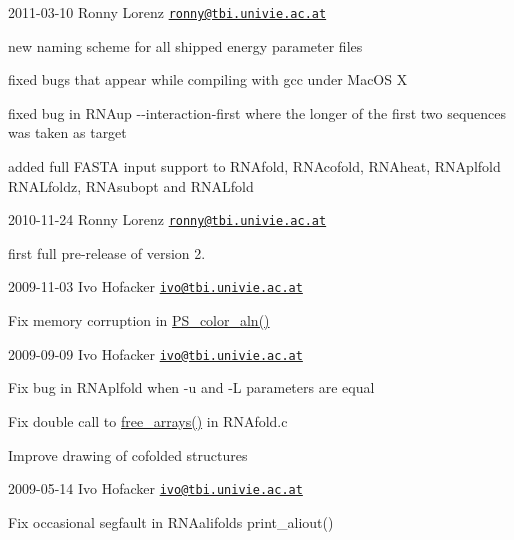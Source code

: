 2011-\/03-\/10 Ronny Lorenz \href{mailto:ronny@tbi.univie.ac.at}{\tt ronny@tbi.\+univie.\+ac.\+at}
\begin{DoxyItemize}
\item new naming scheme for all shipped energy parameter files
\item fixed bugs that appear while compiling with gcc under Mac\+OS X
\item fixed bug in R\+N\+Aup -\/-\/interaction-\/first where the longer of the first two sequences was taken as target
\item added full F\+A\+S\+TA input support to R\+N\+Afold, R\+N\+Acofold, R\+N\+Aheat, R\+N\+Aplfold R\+N\+A\+Lfoldz, R\+N\+Asubopt and R\+N\+A\+Lfold
\end{DoxyItemize}

2010-\/11-\/24 Ronny Lorenz \href{mailto:ronny@tbi.univie.ac.at}{\tt ronny@tbi.\+univie.\+ac.\+at}
\begin{DoxyItemize}
\item first full pre-\/release of version 2.
\end{DoxyItemize}

2009-\/11-\/03 Ivo Hofacker \href{mailto:ivo@tbi.univie.ac.at}{\tt ivo@tbi.\+univie.\+ac.\+at}
\begin{DoxyItemize}
\item Fix memory corruption in \mbox{\hyperlink{group__plotting__utils_ga821802c3685e37e15182341f6217470d}{P\+S\+\_\+color\+\_\+aln()}}
\end{DoxyItemize}

2009-\/09-\/09 Ivo Hofacker \href{mailto:ivo@tbi.univie.ac.at}{\tt ivo@tbi.\+univie.\+ac.\+at}
\begin{DoxyItemize}
\item Fix bug in R\+N\+Aplfold when -\/u and -\/L parameters are equal
\item Fix double call to \mbox{\hyperlink{group__mfe__fold__single_ga107fdfe5fd641868156bfd849f6866c7}{free\+\_\+arrays()}} in R\+N\+Afold.\+c
\item Improve drawing of cofolded structures
\end{DoxyItemize}

2009-\/05-\/14 Ivo Hofacker \href{mailto:ivo@tbi.univie.ac.at}{\tt ivo@tbi.\+univie.\+ac.\+at}


\begin{DoxyItemize}
\item Fix occasional segfault in R\+N\+Aalifold\textquotesingle{}s print\+\_\+aliout()
\end{DoxyItemize}

